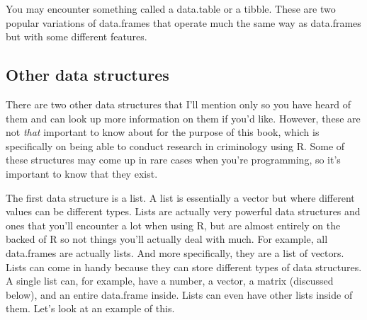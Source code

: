 \documentclass[
]{krantz}
\begin{document}
You may encounter something called a data.table or a tibble. These are two popular variations of data.frames that operate much the same way as data.frames but with some different features.

\hypertarget{other-data-structures}{%
\subsection{Other data structures}\label{other-data-structures}}

There are two other data structures that I'll mention only so you have heard of them and can look up more information on them if you'd like. However, these are not \emph{that} important to know about for the purpose of this book, which is specifically on being able to conduct research in criminology using R. Some of these structures may come up in rare cases when you're programming, so it's important to know that they exist.

The first data structure is a list. A list is essentially a vector but where different values can be different types. Lists are actually very powerful data structures and ones that you'll encounter a lot when using R, but are almost entirely on the backed of R so not things you'll actually deal with much. For example, all data.frames are actually lists. And more specifically, they are a list of vectors. Lists can come in handy because they can store different types of data structures. A single list can, for example, have a number, a vector, a matrix (discussed below), and an entire data.frame inside. Lists can even have other lists inside of them. Let's look at an example of this.
\end{document}

